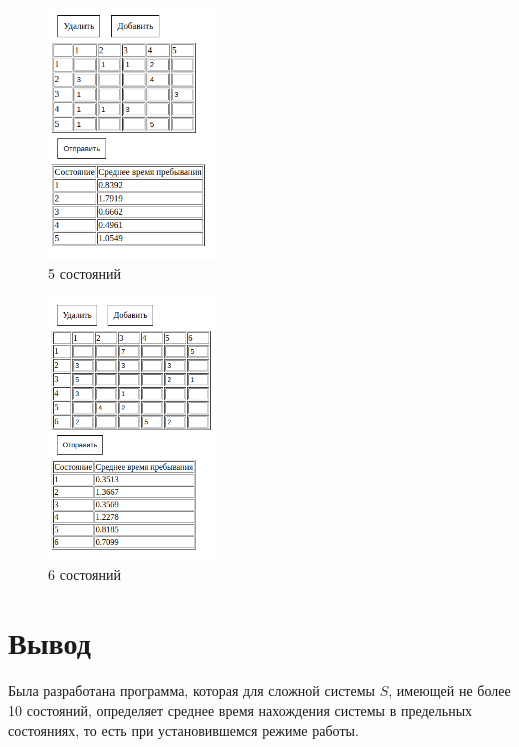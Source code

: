 \begin{figure}[H]
    \centering
    \includegraphics[width=0.4\textwidth]{img/content/5.png}
    \caption{5 состояний}
    \label{fig:5}
\end{figure}

\begin{figure}[H]
    \centering
    \includegraphics[width=0.4\textwidth]{img/content/6.png}
    \caption{6 состояний}
    \label{fig:6}
\end{figure}

\section{Вывод}

Была разработана программа, которая для сложной системы $S$, имеющей не более 10 состояний, определяет среднее время нахождения системы в предельных состояниях, то есть при установившемся режиме работы.
